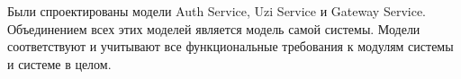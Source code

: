 Были спроектированы модели Auth Service, Uzi Service и Gateway Service. Объединением всех этих моделей является
модель самой системы. Модели соответствуют и учитывают все функциональные требования к модулям системы и системе в целом.









